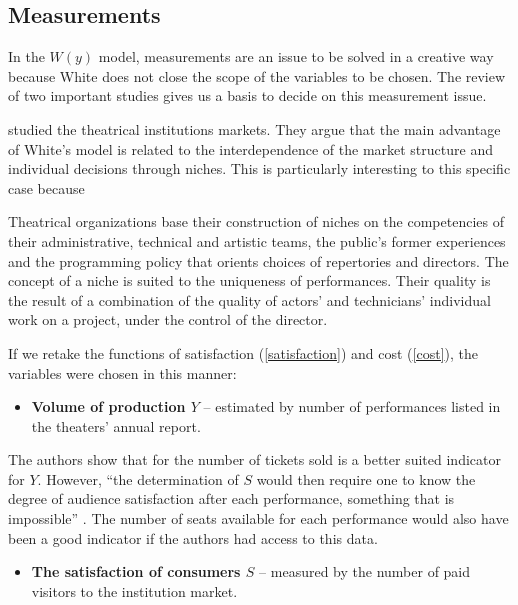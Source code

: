 \documentclass[a4paper, 12pt, openright, oneside, german, french, brazil, english, article]{abntex2}
\begin{document}
	\subsection{Measurements}
	
	In the $W(y)$ model, measurements are an issue to be solved in a creative way because White does not close the scope of the variables to be chosen. The review of two important studies gives us a basis to decide on this measurement issue.
	
	 studied the theatrical institutions markets. They argue that the main advantage of White's model is related to the interdependence of the market structure and individual decisions through niches. This is particularly interesting to this specific case because
	
	\begin{citacao}
		Theatrical organizations base their construction of niches on the competencies of their administrative, technical and artistic teams, the public's former experiences and the programming policy that orients choices of repertories and directors. The concept of a niche is suited to the uniqueness of performances. Their quality is the result of a combination of the quality of actors' and technicians' individual work on a project, under the control of the director. \cite[p. 255]{biencourt2002market}
	\end{citacao}
	
	
	If we retake the functions of satisfaction (\ref{satisfaction}) and cost (\ref{cost}), the variables were chosen in this manner:
	
	\begin{itemize}
		\item \textbf{Volume of production $Y$} -- estimated by number of performances listed in the theaters' annual report.
	\end{itemize}

	The authors show that for  the number of tickets sold is a better suited indicator for $Y$. However, ``the determination of $S$ would then require one to know the degree of audience satisfaction after each performance, something that is impossible'' \cite[p. 264]{biencourt2002market}. The number of seats available for each performance would also have been a good indicator if the authors had access to this data.
	
	\begin{itemize}
		\item \textbf{The satisfaction of consumers $S$} -- measured by the number of paid visitors to the institution market.
	\end{itemize}
	
\end{document}
